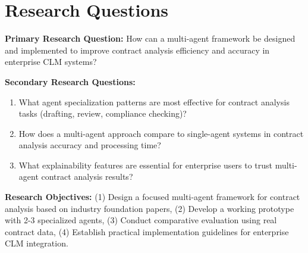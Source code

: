 
\section{Research Questions}\label{section:research_questions}

\textbf{Primary Research Question:} How can a multi-agent framework be designed and implemented to improve contract analysis efficiency and accuracy in enterprise CLM systems?

\textbf{Secondary Research Questions:}
\begin{enumerate}
    \item What agent specialization patterns are most effective for contract analysis tasks (drafting, review, compliance checking)?
    \item How does a multi-agent approach compare to single-agent systems in contract analysis accuracy and processing time?
    \item What explainability features are essential for enterprise users to trust multi-agent contract analysis results?
\end{enumerate}

\textbf{Research Objectives:} (1) Design a focused multi-agent framework for contract analysis based on industry foundation papers, (2) Develop a working prototype with 2-3 specialized agents, (3) Conduct comparative evaluation using real contract data, (4) Establish practical implementation guidelines for enterprise CLM integration.
